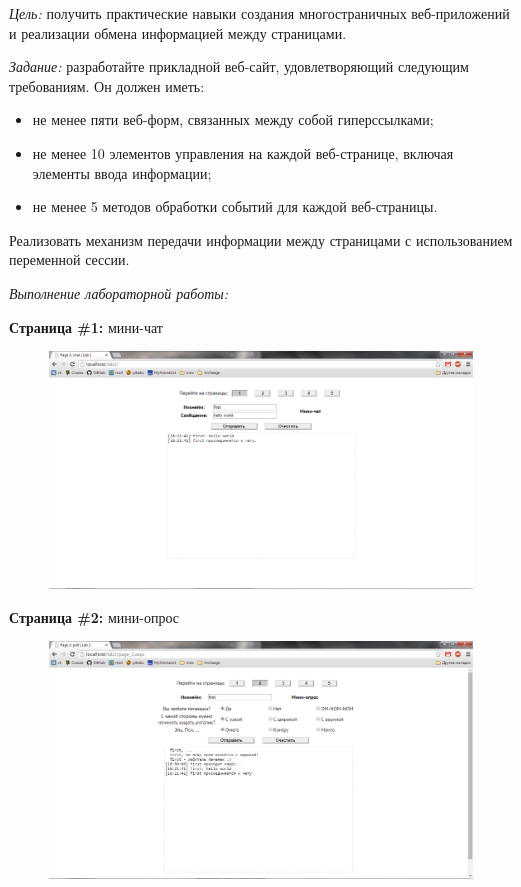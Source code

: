 \documentclass[pscyr]{hedlab}
\begin{document}
  \makeheader

  \emph{Цель:} получить практические навыки создания многостраничных
  веб-приложений и реализации обмена информацией между страницами.
  
  \emph{Задание:} разработайте прикладной веб-сайт, удовлетворяющий следующим
  требованиям. Он должен иметь:
  \begin{itemize}
    \item не менее пяти веб-форм, связанных между собой гиперссылками;
    \item не менее 10 элементов управления на каждой веб-странице, включая
      элементы ввода информации;
    \item не менее 5 методов обработки событий для каждой веб-страницы.
  \end{itemize}
  Реализовать механизм передачи информации между страницами с использованием
  переменной сессии.

  \emph{Выполнение лабораторной работы:}
  
  \textbf{Страница \#1:} мини-чат
  \begin{figure}[h!]
    \center
    \includegraphics[width=.95\textwidth]{01}
  \end{figure}
  
  
  \textbf{Страница \#2:} мини-опрос
  \begin{figure}[h!]
    \center
    \includegraphics[width=.95\textwidth]{02}
  \end{figure}
  
  
\end{document}
